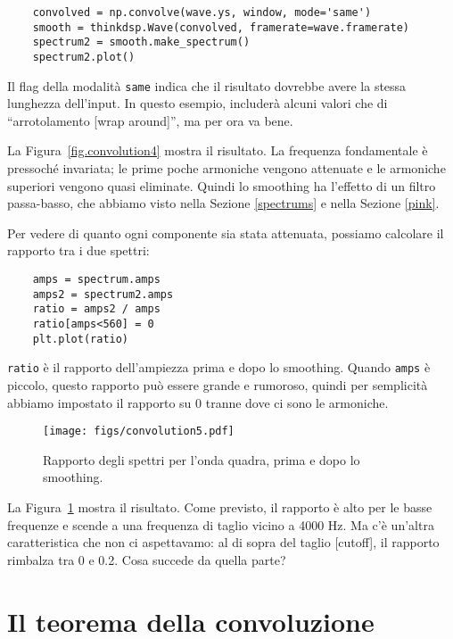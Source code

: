 \documentclass[12pt,a4paper]{book}
\begin{document}
\begin{verbatim} 
    convolved = np.convolve(wave.ys, window, mode='same')
    smooth = thinkdsp.Wave(convolved, framerate=wave.framerate)
    spectrum2 = smooth.make_spectrum()
    spectrum2.plot()
 \end{verbatim} 

Il flag della modalità {\tt same} indica che il risultato dovrebbe avere la stessa lunghezza dell'input. In questo esempio, includerà alcuni valori che di ``arrotolamento [wrap around]'', ma per ora va bene.

La Figura~\ref{fig.convolution4} mostra il risultato. La frequenza fondamentale è pressoché invariata; le prime poche armoniche vengono attenuate e le armoniche superiori vengono quasi eliminate. Quindi lo smoothing ha l'effetto di un filtro passa-basso, che abbiamo visto nella Sezione \ref{spectrums} e nella Sezione \ref{pink}.

Per vedere di quanto ogni componente sia stata attenuata, possiamo calcolare il rapporto tra i due spettri:

\begin{verbatim} 
    amps = spectrum.amps
    amps2 = spectrum2.amps
    ratio = amps2 / amps
    ratio[amps<560] = 0
    plt.plot(ratio)
 \end{verbatim} 

{\tt ratio} è il rapporto dell'ampiezza prima e dopo lo smoothing. Quando {\tt amps} è piccolo, questo rapporto può essere grande e rumoroso, quindi per semplicità abbiamo impostato il rapporto su 0 tranne dove ci sono le armoniche.

\begin{figure} 

\centerline{\texttt{[image: figs/convolution5.pdf]}} \caption{Rapporto degli spettri per l'onda quadra, prima e dopo lo smoothing.} \label{fig.convolution5} \end{figure} 

La Figura~\ref{fig.convolution5} mostra il risultato. Come previsto, il rapporto è alto per le basse frequenze e scende a una frequenza di taglio vicino a 4000 Hz. Ma c'è un'altra caratteristica che non ci aspettavamo: al di sopra del taglio [cutoff], il rapporto rimbalza tra 0 e 0.2. Cosa succede da quella parte?

\section{Il teorema della convoluzione} \label{convtheorem} 
\end{document}

